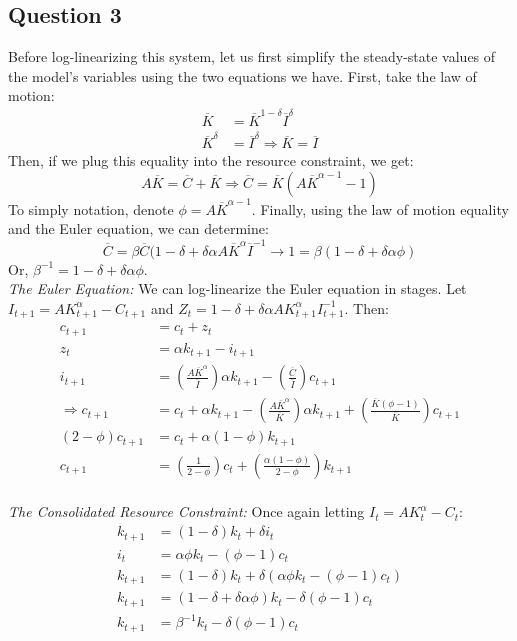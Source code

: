 \documentclass{article}
\begin{document}
\subsection*{Question 3}
Before log-linearizing this system, let us first simplify the steady-state values of the model's variables using the two equations we have. First, take the law of motion:
\begin{align*}
	\overline{K}		&= \overline{K}^{1-\delta}\overline{I}^\delta 	\\
	\overline{K}^\delta &= \overline{I}^\delta	\Rightarrow \overline{K} = \overline{I}
\end{align*}
Then, if we plug this equality into the resource constraint, we get:
\[
	A\overline{K} = \overline{C} + \overline{K} \Rightarrow \overline{C} = \overline{K}\left(A\overline{K}^{\alpha-1} - 1\right)
\]
To simply notation, denote ${\phi = A\overline{K}^{\alpha-1}}$. Finally, using the law of motion equality and the Euler equation, we can determine:
\[
	\overline{C} = \beta\overline{C}(1-\delta+\delta\alpha A\overline{K}^\alpha\overline{I}^{-1} \rightarrow 1 = \beta(1-\delta+\delta\alpha\phi)
\]
Or, ${\beta^{-1} = 1-\delta+\delta\alpha\phi}$.
\medskip \\
\textit{The Euler Equation:} We can log-linearize the Euler equation in stages. Let ${I_{t+1} = AK_{t+1}^\alpha - C_{t+1}}$ and ${Z_t = 1-\delta+\delta\alpha AK^\alpha_{t+1}I_{t+1}^{-1}}$. Then:
	\begin{align*}
		c_{t+1} &= c_t + z_t																															\\
		z_t 	&= \alpha k_{t+1} - i_{t+1}																														\\
		i_{t+1}	&= \left(\frac{A\overline{K}^\alpha}{\overline{I}}\right)\alpha k_{t+1} - \left(\frac{\overline{C}}{\overline{I}}\right)c_{t+1}			\\
	\Rightarrow 	
		c_{t+1} &= c_t + \alpha k_{t+1} - \left(\frac{A\overline{K}^\alpha}{\overline{K}}\right)\alpha k_{t+1} + \left(\frac{\overline{K}\left(\phi - 1\right)}{\overline{K}}\right)c_{t+1}	\\
(2-\phi)c_{t+1} &= c_t + \alpha(1-\phi)k_{t+1}				\\
		c_{t+1} &= \left(\frac{1}{2-\phi}\right)c_t + \left(\frac{\alpha(1-\phi)}{2-\phi}\right)k_{t+1}
	\end{align*}
\\
\textit{The Consolidated Resource Constraint:} Once again letting ${I_t = AK_t^\alpha - C_t}$:
	\begin{align*}
		k_{t+1} &= (1-\delta)k_t + \delta i_t										\\
		i_t 	&= \alpha\phi k_t - (\phi-1)c_t										\\
		k_{t+1} &= (1-\delta)k_t + \delta\left(\alpha\phi k_t - (\phi-1)c_t\right)	\\
		k_{t+1} &= (1-\delta + \delta\alpha\phi)k_t - \delta(\phi-1)c_t				\\
		k_{t+1} &= \beta^{-1}k_t - \delta(\phi-1)c_t				
	\end{align*}
\end{document}
